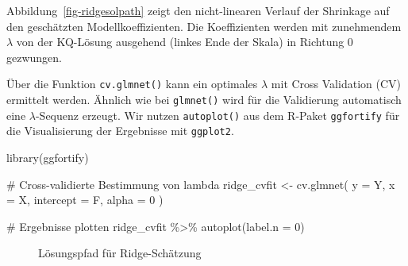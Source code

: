 \documentclass[
  a4paper,
  DIV=11,
  oneside]{scrreprt}
\newenvironment{Shaded}{\begin{snugshade}}{\end{snugshade}}
\newcommand{\AttributeTok}[1]{\textcolor[rgb]{0.40,0.45,0.13}{#1}}
\newcommand{\CommentTok}[1]{\textcolor[rgb]{0.37,0.37,0.37}{#1}}
\newcommand{\DecValTok}[1]{\textcolor[rgb]{0.68,0.00,0.00}{#1}}
\newcommand{\FunctionTok}[1]{\textcolor[rgb]{0.28,0.35,0.67}{#1}}
\newcommand{\NormalTok}[1]{\textcolor[rgb]{0.00,0.23,0.31}{#1}}
\newcommand{\OtherTok}[1]{\textcolor[rgb]{0.00,0.23,0.31}{#1}}
\newcommand{\SpecialCharTok}[1]{\textcolor[rgb]{0.37,0.37,0.37}{#1}}
\begin{document}
Abbildung~\ref{fig-ridgesolpath} zeigt den nicht-linearen Verlauf der
Shrinkage auf den geschätzten Modellkoeffizienten. Die Koeffizienten
werden mit zunehmendem \(\lambda\) von der KQ-Lösung ausgehend (linkes
Ende der Skala) in Richtung 0 gezwungen.

Über die Funktion \texttt{cv.glmnet()} kann ein optimales \(\lambda\)
mit Cross Validation (CV) ermittelt werden. Ähnlich wie bei
\texttt{glmnet()} wird für die Validierung automatisch eine
\(\lambda\)-Sequenz erzeugt. Wir nutzen \texttt{autoplot()} aus dem
R-Paket \texttt{ggfortify} für die Visualisierung der Ergebnisse mit
\texttt{ggplot2}.

\begin{Shaded}
\begin{Highlighting}[]
\FunctionTok{library}\NormalTok{(ggfortify)}

\CommentTok{\# Cross{-}validierte Bestimmung von lambda}
\NormalTok{ridge\_cvfit }\OtherTok{\textless{}{-}} \FunctionTok{cv.glmnet}\NormalTok{(}
  \AttributeTok{y =}\NormalTok{ Y, }
  \AttributeTok{x =}\NormalTok{ X, }
  \AttributeTok{intercept =}\NormalTok{ F,}
  \AttributeTok{alpha =} \DecValTok{0}
\NormalTok{) }

\CommentTok{\# Ergebnisse plotten}
\NormalTok{ridge\_cvfit }\SpecialCharTok{\%\textgreater{}\%} 
  \FunctionTok{autoplot}\NormalTok{(}\AttributeTok{label.n =} \DecValTok{0}\NormalTok{)}
\end{Highlighting}
\end{Shaded}

\begin{figure}[t]


\caption{\label{fig-ridgecvplot}Lösungspfad für Ridge-Schätzung}

\end{figure}%
\end{document}
